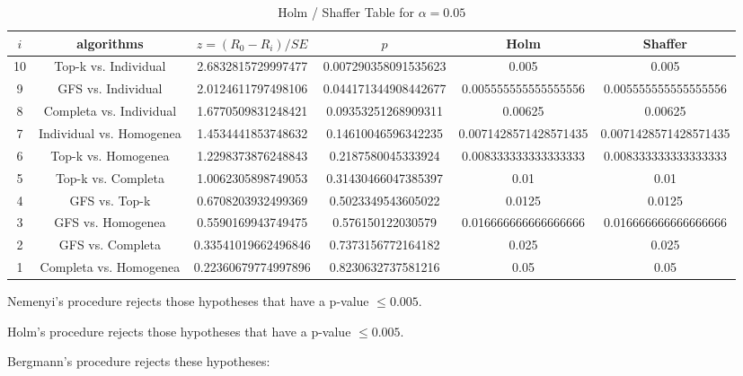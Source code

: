 \documentclass[a4paper,10pt]{article}
\begin{document}
\begin{landscape}
\begin{table}[!htp]
\centering\tiny
\caption{Holm / Shaffer Table for $\alpha=0.05$}
\begin{tabular}{cccccc}
$i$&algorithms&$z=(R_0 - R_i)/SE$&$p$&Holm&Shaffer\\
\hline
10&Top-k vs. Individual&2.6832815729997477&0.007290358091535623&0.005&0.005\\
9&GFS vs. Individual&2.0124611797498106&0.044171344908442677&0.005555555555555556&0.005555555555555556\\
8&Completa vs. Individual&1.6770509831248421&0.09353251268909311&0.00625&0.00625\\
7&Individual vs. Homogenea&1.4534441853748632&0.14610046596342235&0.0071428571428571435&0.0071428571428571435\\
6&Top-k vs. Homogenea&1.2298373876248843&0.2187580045333924&0.008333333333333333&0.008333333333333333\\
5&Top-k vs. Completa&1.0062305898749053&0.31430466047385397&0.01&0.01\\
4&GFS vs. Top-k&0.6708203932499369&0.5023349543605022&0.0125&0.0125\\
3&GFS vs. Homogenea&0.5590169943749475&0.576150122030579&0.016666666666666666&0.016666666666666666\\
2&GFS vs. Completa&0.33541019662496846&0.7373156772164182&0.025&0.025\\
1&Completa vs. Homogenea&0.22360679774997896&0.8230632737581216&0.05&0.05\\
\hline
\end{tabular}
\end{table}
Nemenyi's procedure rejects those hypotheses that have a p-value $\le0.005$.


Holm's procedure rejects those hypotheses that have a p-value $\le0.005$.


Bergmann's procedure rejects these hypotheses:


\begin{itemize}


\end{itemize}



\end{landscape}
\end{document}
